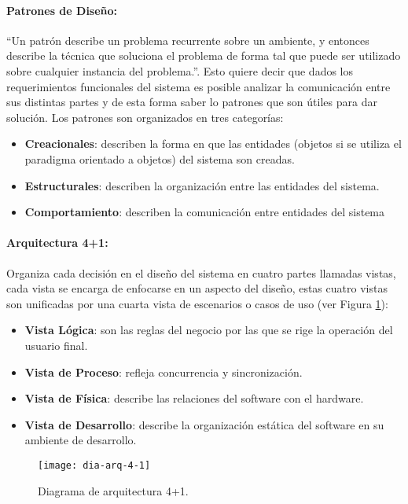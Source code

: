 \paragraph{Patrones de Diseño:} ``Un patrón describe un problema recurrente sobre un ambiente, y entonces describe la técnica que soluciona el problema de forma tal que puede ser utilizado sobre cualquier instancia del problema.''\cite{DesignPatterns}. Esto quiere decir que dados los requerimientos funcionales del sistema es posible analizar la comunicación entre sus distintas partes y de esta forma saber lo patrones que son útiles para dar solución. Los patrones son organizados en tres categorías:
\begin{itemize}
	\item \textbf{Creacionales}: describen la forma en que las entidades (objetos si se utiliza el paradigma orientado a objetos) del sistema son creadas.
	\item \textbf{Estructurales}: describen la organización entre las entidades del sistema.
	\item \textbf{Comportamiento}: describen la comunicación entre entidades del sistema
\end{itemize}
\paragraph{Arquitectura 4+1:} Organiza cada decisión en el diseño del sistema en cuatro partes llamadas vistas, cada vista se encarga de enfocarse en un aspecto del diseño, estas cuatro vistas son unificadas por una cuarta vista de escenarios o casos de uso (ver Figura \ref{fig:dia-arq-4-1}):
\begin{itemize}
	\item \textbf{Vista Lógica}: son las reglas del negocio por las que se rige la operación del usuario final.
	\item \textbf{Vista de Proceso}: refleja concurrencia y sincronización.
	\item \textbf{Vista de Física}: describe las relaciones del software con el hardware.
	\item \textbf{Vista de Desarrollo}: describe la organización estática del software en su ambiente de desarrollo.\cite{ViewModel4plus1}
\end{itemize}

\begin{figure}[h]
\centering
\texttt{[image: dia-arq-4-1]} 
\caption{Diagrama de arquitectura 4+1.}
\label{fig:dia-arq-4-1}
\end{figure}


